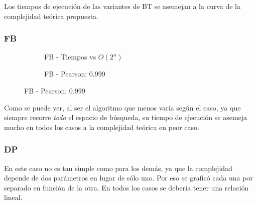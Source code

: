 Los tiempos de ejecución de las variantes de BT se asemejan a la curva de la complejidad teórica propuesta.

\subsubsection{FB}

\begin{figure}[H]
    \centering
    \begin{subfigure}[b]{0.48\textwidth}
        \centering
        
        \caption{FB - Tiempos vs $O(2^n)$}
    \end{subfigure}
    \hfill
    \begin{subfigure}[b]{0.42\textwidth}
        \centering
        
        \caption{FB - Pearson: 0.999}
    \end{subfigure}
\end{figure}

Como se puede ver, al ser el algoritmo que menos varía según el caso, ya que siempre recorre \textit{todo} el espacio de búsqueda, su tiempo de ejecución se asemeja mucho en todos los casos a la complejidad teórica en peor caso.

\subsubsection{DP}

En este caso no es tan simple como para los demás, ya que la complejidad depende de dos parámetros en lugar de sólo uno. Por eso se graficó cada una por separado en función de la otra. En todos los casos se debería tener una relación lineal.

